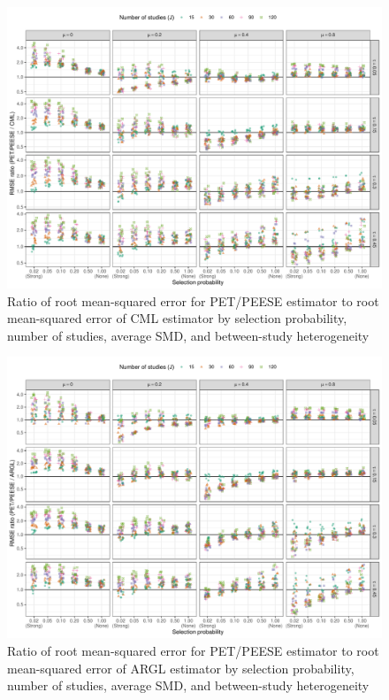 \documentclass[
  american,
  man, donotrepeattitle,floatsintext]{apa7}
\begin{document}
\begin{figure}
\includegraphics{step-function-selection-models-with-dependent-effects_files/figure-latex/rmse-PET-CML-1} \caption{Ratio of root mean-squared error for PET/PEESE estimator to root mean-squared error of CML estimator by selection probability, number of studies, average SMD, and between-study heterogeneity}\label{fig:rmse-PET-CML}
\end{figure}

\begin{figure}
\includegraphics{step-function-selection-models-with-dependent-effects_files/figure-latex/rmse-PET-ARGL-1} \caption{Ratio of root mean-squared error for PET/PEESE estimator to root mean-squared error of ARGL estimator by selection probability, number of studies, average SMD, and between-study heterogeneity}\label{fig:rmse-PET-ARGL}
\end{figure}
\end{document}
